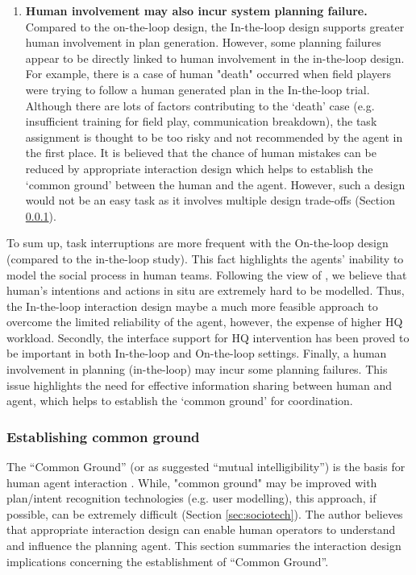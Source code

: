 \begin{enumerate}
\item \textbf{Human involvement may also incur system planning failure.} \\
Compared to the on-the-loop design, the In-the-loop design supports greater human involvement in plan generation. However, some planning failures appear to be directly linked to human involvement in the in-the-loop design. For example, there is a case of  human "death" occurred  when field players were trying to follow a human generated plan in the In-the-loop trial.  Although there are lots of factors contributing to the `death' case (e.g. insufficient training for field play, communication breakdown), the task assignment is thought to be too risky and not recommended by the agent in the first place. It is believed that the chance of human mistakes can be reduced by appropriate interaction design which helps to establish the `common ground' between the human and the agent. However, such a design would not be an easy task as it involves multiple design trade-offs  (Section \ref{sec:conclusionCG}).
\end{enumerate}

To sum up, task interruptions are more frequent with the On-the-loop design (compared to the in-the-loop study). This fact highlights the agents' inability to model the social process in human teams. Following the view of \cite{Suchman1987}, we believe that human's intentions and actions in situ are extremely hard to be modelled. Thus, the In-the-loop interaction design maybe  a much more feasible approach to overcome the limited reliability of the agent, however, the expense of higher HQ workload. Secondly, the interface support for HQ intervention has been proved to be important in both In-the-loop and On-the-loop settings. Finally, a human involvement in planning (in-the-loop) may incur some planning failures. This issue highlights the need for effective information sharing between human and agent, which helps to establish the `common ground' for coordination. \\


\subsubsection{Establishing common ground} \label{sec:conclusionCG}
The ``Common Ground'' (or as \cite{Suchman1987} suggested ``mutual intelligibility'') is the basis for human agent interaction \cite{Bradshaw2011}.  While, "common ground" may be improved with plan/intent recognition technologies (e.g. user modelling), this approach, if possible, can be extremely difficult (Section \ref{sec:sociotech}). The author believes that appropriate interaction design can enable human operators to understand and influence the planning agent. This section summaries the interaction design implications concerning the establishment of  ``Common Ground''.\\


